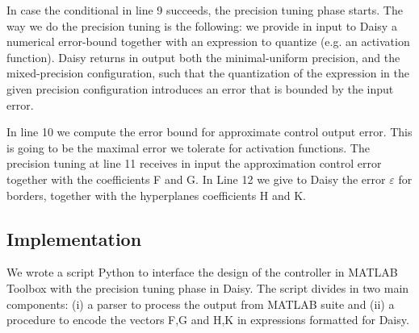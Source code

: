 In case the conditional in line 9 succeeds, the precision tuning phase starts. The way we do the precision tuning is the following: we provide in input to Daisy a numerical error-bound together with an expression to quantize (e.g. an activation function). Daisy returns in output both the minimal-uniform precision, and the mixed-precision configuration, such that the quantization of the expression in the given precision configuration introduces an error that is bounded by the input error.

In line 10 we compute the error bound for approximate control output error. This is going to be the maximal error we tolerate for activation functions. The precision tuning at line 11 receives in input the approximation control error together with the coefficients F and G. In Line 12 we give to Daisy the error $\varepsilon$ for borders, together with the hyperplanes coefficients H and K.


\subsection{Implementation}
We wrote a script Python to interface the design of the controller in MATLAB Toolbox with the precision tuning phase in Daisy. The script divides in two main components: (i) a parser to process the output from MATLAB suite and (ii) a procedure to encode the vectors F,G and H,K in expressions formatted for Daisy.



